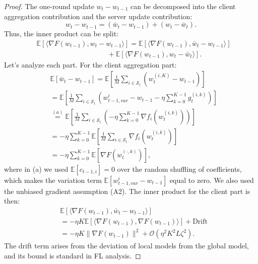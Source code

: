 \documentclass[11pt]{article}
\begin{document}
\begin{proof}
The one-round update $w_t - w_{t-1}$ can be decomposed into the client aggregation contribution and the server update contribution:
\begin{equation}
    w_t - w_{t-1} = (\bar{w}_t - w_{t-1}) + (w_t - \bar{w}_t).
\end{equation}
Thus, the inner product can be split:
\begin{align}
    &\mathbb{E}[\langle \nabla F(w_{t-1}), w_t - w_{t-1} \rangle] = \mathbb{E}[\langle \nabla F(w_{t-1}), \bar{w}_t - w_{t-1} \rangle] \nonumber \\
    & \qquad\qquad\qquad\qquad\qquad + \mathbb{E}[\langle \nabla F(w_{t-1}), w_t - \bar{w}_t \rangle]. \label{eq:inner_prod_split}
\end{align}
Let's analyze each part. For the client aggregation part:
\begin{align}
    &\mathbb{E}[\bar{w}_t - w_{t-1}] = \mathbb{E}\left[\frac{1}{M}\sum_{i \in \mathcal{S}_t} (w_t^{(i,K)} - w_{t-1})\right] \nonumber \\
    &= \mathbb{E}\left[\frac{1}{M}\sum_{i \in \mathcal{S}_t} (w_{t-1,var}^i - w_{t-1} - \eta \sum_{k=0}^{K-1} g_t^{(i,k)})\right] \nonumber \\
    &\overset{(a)}{=} \mathbb{E}\left[\frac{1}{M}\sum_{i \in \mathcal{S}_t} \left(-\eta \sum_{k=0}^{K-1} \nabla f_i(w_t^{(i,k)})\right)\right] \nonumber \\
    &= -\eta \sum_{k=0}^{K-1} \mathbb{E}\left[\frac{1}{M}\sum_{i \in \mathcal{S}_t} \nabla f_i(w_t^{(i,k)})\right] \nonumber \\
    &= -\eta \sum_{k=0}^{K-1} \mathbb{E}[\nabla F(w_t^{(\cdot,k)})],
\end{align}
where in (a) we used $\mathbb{E}[c_{t-1,i}]=0$ over the random shuffling of coefficients, which makes the variation term $\mathbb{E}[w_{t-1,var}^i - w_{t-1}]$ equal to zero. We also used the unbiased gradient assumption (A2).
The inner product for the client part is then:
\begin{align}
    &\mathbb{E}[\langle \nabla F(w_{t-1}), \bar{w}_t - w_{t-1} \rangle] \nonumber \\
    &= -\eta K \mathbb{E}[\langle \nabla F(w_{t-1}), \nabla F(w_{t-1}) \rangle] + \text{Drift} \nonumber \\
    &= -\eta K \|\nabla F(w_{t-1})\|^2 + \mathcal{O}(\eta^2 K^2 L \zeta^2).
\end{align}
The drift term arises from the deviation of local models from the global model, and its bound is standard in FL analysis.


\end{proof}
\end{document}
